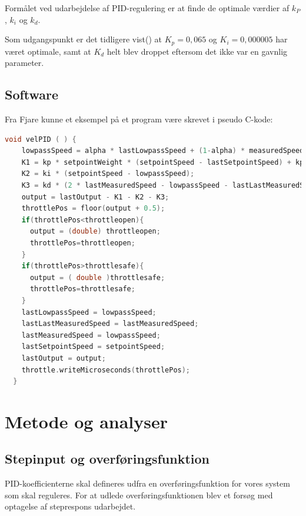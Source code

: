Formålet ved udarbejdelse af PID-regulering er at finde de optimale værdier af $k_P$, $k_i$ og $k_d$.


Som udgangspunkt er det tidligere vist(\autocite{pid1}) at $K_p=0,065$ og $K_i=0,000005$ har været optimale, samt at $K_d$ helt blev droppet eftersom det ikke var en gavnlig parameter.

\subsection{Software}
\label{sec:software}

Fra Fjare\autocite{pid1} kunne et eksempel på et program være skrevet i pseudo C-kode:
\begin{lstlisting}[language=C,basicstyle=\ttfamily]
  void velPID ( ) {
    lowpassSpeed = alpha * lastLowpassSpeed + (1-alpha) * measuredSpeed;
    K1 = kp * setpointWeight * (setpointSpeed - lastSetpointSpeed) + kp * (lastMeasuredSpeed - lowpassSpeed);
    K2 = ki * (setpointSpeed - lowpassSpeed);
    K3 = kd * (2 * lastMeasuredSpeed - lowpassSpeed - lastLastMeasuredSpeed);
    output = lastOutput - K1 - K2 - K3;
    throttlePos = floor(output + 0.5);
    if(throttlePos<throttleopen){
      output = (double) throttleopen;
      throttlePos=throttleopen;
    }
    if(throttlePos>throttlesafe){
      output = ( double )throttlesafe;
      throttlePos=throttlesafe;
    }
    lastLowpassSpeed = lowpassSpeed;
    lastLastMeasuredSpeed = lastMeasuredSpeed;
    lastMeasuredSpeed = lowpassSpeed;
    lastSetpointSpeed = setpointSpeed;
    lastOutput = output;
    throttle.writeMicroseconds(throttlePos);
  }
\end{lstlisting}


\section{Metode og analyser}
\label{sec:metode}

\subsection{Stepinput og overføringsfunktion}
\label{sec:tests}

PID-koefficienterne skal defineres udfra en overføringsfunktion for vores system som skal reguleres. For at udlede overføringsfunktionen blev et forsøg med optagelse af steprespons udarbejdet.

